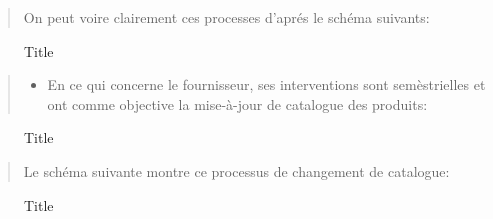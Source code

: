 \documentclass[a4paper]{report}
\begin{document}
\begin{doublespace}
\begin{quote}
On peut voire clairement ces processes d'aprés le schéma suivants:
\end{quote}


\begin{figure}[H] 
	\begin{center}
		\caption{Title}
	\end{center}
\end{figure}

\begin{quote}
\begin{itemize}
\item
  En ce qui concerne le fournisseur, ses interventions sont
  semèstrielles et ont comme objective la mise-à-jour de catalogue des
  produits:
\end{itemize}
\end{quote}

\begin{figure}[H] 
	\begin{center}
		\caption{Title}
	\end{center}
\end{figure}

\begin{quote}
Le schéma suivante montre ce processus de changement de catalogue:
\end{quote}

\begin{figure}[H] 
	\begin{center}
		\caption{Title}
	\end{center}
\end{figure}


\end{doublespace}
\end{document}
